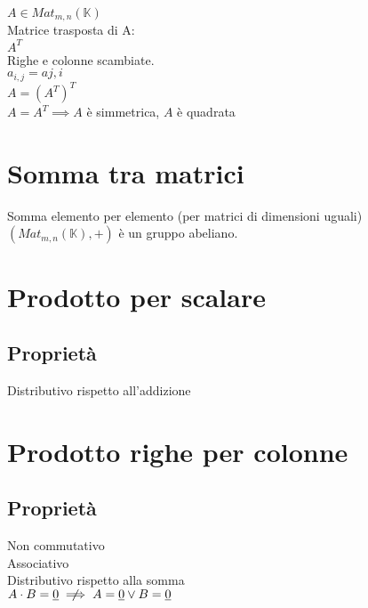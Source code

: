 \documentclass[a4paper, twoside, italian, 11pt]{book}
\newcommand{\K}{\mathbb{K}}
\begin{document}
$A \in Mat_{m,n}(\K)$ \\

\noindent
Matrice trasposta di A: \\
$A^T$ \\

\noindent
Righe e colonne scambiate. \\
$a_{i,j} = a{j,i}$ \\

\noindent
$A = (A^T)^T$ \\

\noindent
$A = A^T \implies A$ è simmetrica, $A$ è quadrata



\section{Somma tra matrici}

Somma elemento per elemento (per matrici di dimensioni uguali) \\

\noindent
$(Mat_{m,n}(\K), +)$ è un gruppo abeliano.



\section{Prodotto per scalare}



\subsection{Proprietà}

Distributivo rispetto all'addizione



\section{Prodotto righe per colonne}



\subsection{Proprietà}

Non commutativo \\
Associativo \\
Distributivo rispetto alla somma \\

\noindent
$A \cdot B = \underline{0} \centernot\implies A = \underline{0} \lor B = \underline{0}$ \\
\end{document}
